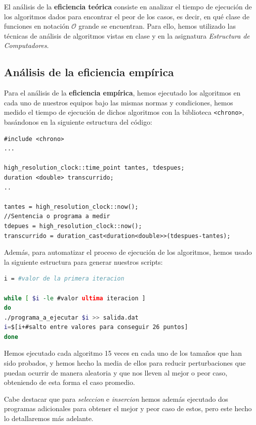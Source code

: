 \documentclass[10pt,a4paper]{article}
\begin{document}
El análisis de la \textbf{eficiencia teórica} consiste en analizar el tiempo de ejecución de los algoritmos dados para encontrar el peor de los casos, es decir, en qué clase de funciones en notación \(\mathcal{O}\) grande se encuentran. Para ello, hemos utilizado las técnicas de análisis de algoritmos vistas en clase y en la asignatura \textit{Estructura de Computadores}.

\subsection{Análisis de la eficiencia empírica}

Para el análisis de la \textbf{eficiencia empírica}, hemos ejecutado los algoritmos en cada uno de nuestros equipos bajo las mismas normas y condiciones, hemos medido el tiempo de ejecución de dichos algoritmos con la biblioteca \texttt{<chrono>}, basándonos en la siguiente estructura del código:

\begin{lstlisting}
#include <chrono>
...

high_resolution_clock::time_point tantes, tdespues;
duration <double> transcurrido;
..

tantes = high_resolution_clock::now();
//Sentencia o programa a medir
tdepues = high_resolution_clock::now();
transcurrido = duration_cast<duration<double>>(tdespues-tantes);
\end{lstlisting}

Además, para automatizar el proceso de ejecución de los algoritmos, hemos usado la siguiente estructura para generar nuestros scripts:
\begin{lstlisting}[language=bash]
i = #valor de la primera iteracion

while [ $i -le #valor ultima iteracion ]
do
./programa_a_ejecutar $i >> salida.dat
i=$[i+#salto entre valores para conseguir 26 puntos]
done
\end{lstlisting}

Hemos ejecutado cada algoritmo 15 veces en cada uno de los tamaños que han sido probados, y hemos hecho la media de ellos para reducir perturbaciones que puedan ocurrir de manera aleatoria y que nos lleven al mejor o peor caso, obteniendo de esta forma el caso promedio. 

Cabe destacar que para \textit{seleccion} e \textit{insercion} hemos además ejecutado dos programas adicionales para obtener el mejor y peor caso de estos, pero este hecho lo detallaremos más adelante. \\
\end{document}
